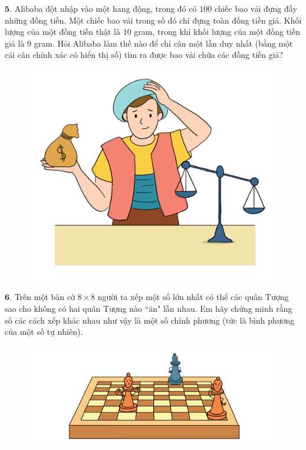 \begin{multicols}{2}
\begin{figure}[H]
		\vspace*{-10pt}
	\end{figure}
	$\pmb{5.}$ Alibaba đột nhập vào một hang động, trong đó có $100$ chiếc bao vải đựng đầy những đồng tiền. Một chiếc bao vải trong số đó chỉ đựng toàn đồng tiền giả. Khối lượng của một đồng tiền thật là $10$ gram, trong khi khối lượng của một đồng tiền giả là $9$ gram. Hỏi Alibaba làm thế nào để chỉ cân một lần duy nhất (bằng một cái cân chính xác có hiển thị số) tìm ra được bao vải chứa các đồng tiền giả?
	\begin{figure}[H]
		\centering
		\vspace*{-5pt}
		\captionsetup{labelformat= empty, justification=centering}
		\includegraphics[width=15\linewidth]{Pi6_bai5}
		\vspace*{-10pt}
	\end{figure}
	$\pmb{6.}$ 	Trên một bàn cờ $8\times8$ người ta xếp một số lớn nhất có thể các quân Tượng sao cho không có hai quân Tượng nào ``ăn" lẫn nhau. Em hãy chứng minh rằng số các cách xếp khác nhau như vậy là một số chính phương (tức là bình phương của một số tự nhiên).
	\begin{figure}[H]
		\centering
		\vspace*{-5pt}
		\captionsetup{labelformat= empty, justification=centering}
		\includegraphics[width=1\linewidth]{Pi6_bai6}
		\vspace*{-5pt}
	\end{figure}
\end{multicols}


